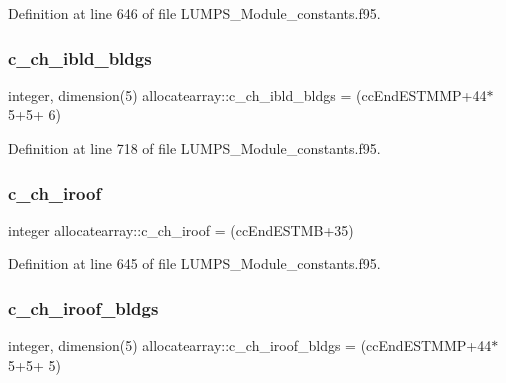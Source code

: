 Definition at line 646 of file L\+U\+M\+P\+S\+\_\+\+Module\+\_\+constants.\+f95.

\mbox{\label{namespaceallocatearray_a35459b33135ea1d0051778a726c8e1e9}} 
\subsubsection{\texorpdfstring{c\+\_\+ch\+\_\+ibld\+\_\+bldgs}{c\_ch\_ibld\_bldgs}}
{\footnotesize\ttfamily integer, dimension(5) allocatearray\+::c\+\_\+ch\+\_\+ibld\+\_\+bldgs = (cc\+End\+E\+S\+T\+M\+MP+44$\ast$5+5+ 6)}



Definition at line 718 of file L\+U\+M\+P\+S\+\_\+\+Module\+\_\+constants.\+f95.

\mbox{\label{namespaceallocatearray_a695a45e540039b9484c1069b77d4068a}} 
\subsubsection{\texorpdfstring{c\+\_\+ch\+\_\+iroof}{c\_ch\_iroof}}
{\footnotesize\ttfamily integer allocatearray\+::c\+\_\+ch\+\_\+iroof = (cc\+End\+E\+S\+T\+MB+35)}



Definition at line 645 of file L\+U\+M\+P\+S\+\_\+\+Module\+\_\+constants.\+f95.

\mbox{\label{namespaceallocatearray_a46eeb6c1e9d75b2402799845e833d5e7}} 
\subsubsection{\texorpdfstring{c\+\_\+ch\+\_\+iroof\+\_\+bldgs}{c\_ch\_iroof\_bldgs}}
{\footnotesize\ttfamily integer, dimension(5) allocatearray\+::c\+\_\+ch\+\_\+iroof\+\_\+bldgs = (cc\+End\+E\+S\+T\+M\+MP+44$\ast$5+5+ 5)}



